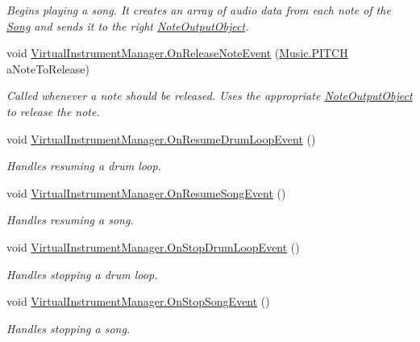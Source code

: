 \begin{DoxyCompactItemize}
\begin{DoxyCompactList}\small\item\em Begins playing a song. It creates an array of audio data from each note of the \hyperlink{class_song}{Song} and sends it to the right \hyperlink{class_note_output_object}{Note\+Output\+Object}. \end{DoxyCompactList}\item 
void \hyperlink{group___v_i_m_handlers_ga0f0a34c251d154131f9ea130a54dc989}{Virtual\+Instrument\+Manager.\+On\+Release\+Note\+Event} (\hyperlink{group___music_enums_ga508f69b199ea518f935486c990edac1d}{Music.\+P\+I\+T\+CH} a\+Note\+To\+Release)
\begin{DoxyCompactList}\small\item\em Called whenever a note should be released. Uses the appropriate \hyperlink{class_note_output_object}{Note\+Output\+Object} to release the note. \end{DoxyCompactList}\item 
void \hyperlink{group___v_i_m_handlers_ga97e3e73e05a7ab6027f25573712367a2}{Virtual\+Instrument\+Manager.\+On\+Resume\+Drum\+Loop\+Event} ()
\begin{DoxyCompactList}\small\item\em Handles resuming a drum loop. \end{DoxyCompactList}\item 
void \hyperlink{group___v_i_m_handlers_gaca3d2c89672fe0eb3d94b3cb2072de59}{Virtual\+Instrument\+Manager.\+On\+Resume\+Song\+Event} ()
\begin{DoxyCompactList}\small\item\em Handles resuming a song. \end{DoxyCompactList}\item 
void \hyperlink{group___v_i_m_handlers_ga9d251d8b2036a3416680ced5d6125d0e}{Virtual\+Instrument\+Manager.\+On\+Stop\+Drum\+Loop\+Event} ()
\begin{DoxyCompactList}\small\item\em Handles stopping a drum loop. \end{DoxyCompactList}\item 
void \hyperlink{group___v_i_m_handlers_ga5d9afb7a74107b5c6016555f0bb0a0a8}{Virtual\+Instrument\+Manager.\+On\+Stop\+Song\+Event} ()
\begin{DoxyCompactList}\small\item\em Handles stopping a song. \end{DoxyCompactList}\end{DoxyCompactItemize}


